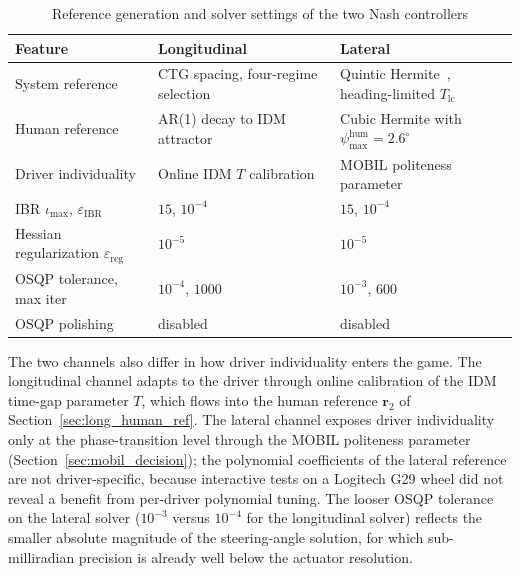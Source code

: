 \documentclass[12pt,a4paper,oneside]{report}
\begin{document}
\begin{table}[H]
\centering
\footnotesize
\setlength{\tabcolsep}{4pt}
\renewcommand{\arraystretch}{1.2}
\begin{tabularx}{\textwidth}{|l|X|X|}
\hline
\textbf{Feature} & \textbf{Longitudinal} & \textbf{Lateral} \\
\hline
System reference                             & CTG spacing, four-regime selection~\cite{rajamaniVehicleDynamicsControl2005} & Quintic Hermite~\cite{guHumanlikeMotionPlanning2014}, heading-limited $T_{\text{lc}}$ \\
Human reference                              & AR(1) decay to IDM attractor~\cite{fladCooperativeSharedControl2017, naTwoNashequilibriumbasedSteering2022} & Cubic Hermite with $\psi_{\max}^{\text{hum}} = 2.6^\circ$~\cite{leeComprehensiveExaminationNaturalistic2004a} \\
Driver individuality                         & Online IDM $T$ calibration                      & MOBIL politeness parameter             \\
IBR $\iota_{\max}$, $\varepsilon_{\text{IBR}}$ & $15$, $10^{-4}$                               & $15$, $10^{-4}$                        \\
Hessian regularization $\varepsilon_{\text{reg}}$ & $10^{-5}$                                  & $10^{-5}$                              \\
OSQP tolerance, max iter                     & $10^{-4}$, $1000$                               & $10^{-3}$, $600$                       \\
OSQP polishing                               & disabled                                        & disabled                               \\
\hline
\end{tabularx}
\caption{Reference generation and solver settings of the two Nash controllers}
\label{tab:comparison_ref_solver}
\end{table}

The two channels also differ in how driver individuality enters the game. The longitudinal channel adapts to the driver through online calibration of the IDM time-gap parameter $T$, which flows into the human reference $\mathbf{r}_2$ of Section~\ref{sec:long_human_ref}. The lateral channel exposes driver individuality only at the phase-transition level through the MOBIL politeness parameter (Section~\ref{sec:mobil_decision}); the polynomial coefficients of the lateral reference are not driver-specific, because interactive tests on a Logitech G29 wheel did not reveal a benefit from per-driver polynomial tuning. The looser OSQP tolerance on the lateral solver ($10^{-3}$ versus $10^{-4}$ for the longitudinal solver) reflects the smaller absolute magnitude of the steering-angle solution, for which sub-milliradian precision is already well below the actuator resolution.
\end{document}
